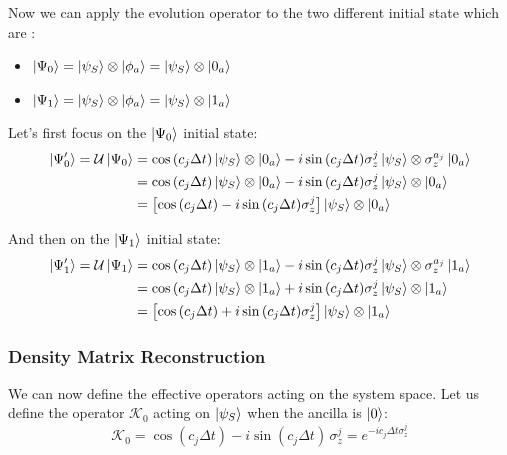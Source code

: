 \documentclass[a4paper,12pt]{article}
\begin{document}
	\newpage
	Now we can apply the evolution operator to the two different initial state which are :

	\begin{itemize}
		\item $ \ket{\Psi_{0}} = \ket{\psi_S} \otimes \ket{\phi_a} = \ket{\psi_S} \otimes  \ket{0_a} $ \\
		\item $ \ket{\Psi_{1}} = \ket{\psi_S} \otimes \ket{\phi_a} = \ket{\psi_S} \otimes  \ket{1_a} $
		\label{eq:psi_iniz_0_1}
	\end{itemize}

	Let's first focus on the $ \ket{\Psi_{0}} $ initial state:
	\begin{align}
		\ket{\Psi'_{0}} = \mathcal{U} \ket{\Psi_{0}}
		&= \cos{\left(c_j \Delta t\right)} \ket{\psi_{S}} \otimes \ket{0_a} - i\sin{\left(c_j \Delta t \right)} \sigma_{z}^{j} \ket{\psi_{S}} \otimes \sigma_{z}^{a_j}\ket{0_a} \notag \\
		&= \cos{\left(c_j \Delta t\right)} \ket{\psi_{S}} \otimes \ket{0_a} - i\sin{\left(c_j \Delta t \right)} \sigma_{z}^{j} \ket{\psi_{S}} \otimes \ket{0_a} \notag \\
		&= \left[\cos{\left(c_j \Delta t\right)} - i\sin{\left(c_j \Delta t \right)} \sigma_{z}^{j} \right] \ket{\psi_{S}} \otimes \ket{0_a}
		\label{eq:psi_0_evo}
	\end{align}

	And then on the $ \ket{\Psi_{1}} $ initial state:
	\begin{align}
		\ket{\Psi'_{1}} = \mathcal{U} \ket{\Psi_{1}}
		&= \cos{\left(c_j \Delta t\right)} \ket{\psi_{S}} \otimes \ket{1_a} - i\sin{\left(c_j \Delta t \right)} \sigma_{z}^{j} \ket{\psi_{S}} \otimes \sigma_{z}^{a_j}\ket{1_a} \notag \\
		&= \cos{\left(c_j \Delta t\right)} \ket{\psi_{S}} \otimes \ket{1_a} + i\sin{\left(c_j \Delta t \right)} \sigma_{z}^{j} \ket{\psi_{S}} \otimes \ket{1_a} \notag \\
		&= \left[\cos{\left(c_j \Delta t\right)} + i\sin{\left(c_j \Delta t \right)} \sigma_{z}^{j} \right] \ket{\psi_{S}} \otimes \ket{1_a}
		\label{eq:psi_1_evo}
	\end{align}

	\subsubsection{Density Matrix Reconstruction}
	\label{sub:Density_Matrix_Reconstruction_Diff}

	We can now define the effective operators acting on the system space. Let us define the operator $\mathcal{K}_0$ acting on $\ket{\psi_S}$ when the ancilla is $\ket{0}$:
	\begin{equation}
		\mathcal{K}_0 = \cos{\left( c_j \Delta t \right)} - i \sin{\left( c_j \Delta t \right)} \, \sigma_{z}^{j} = e^{-i c_j \Delta t \sigma_z^j}
		\label{eq:k0_def}
	\end{equation}
\end{document}
